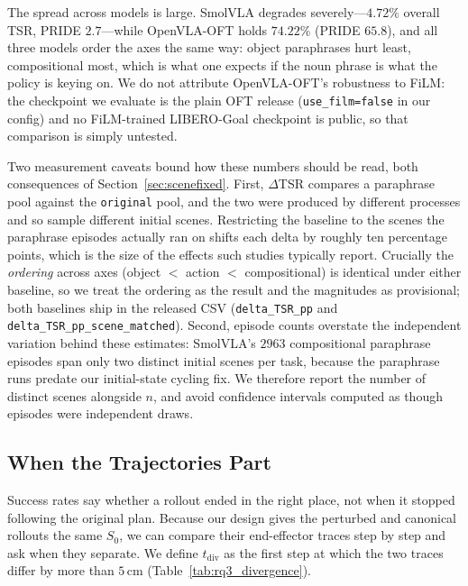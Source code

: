 \documentclass[11pt]{article}
\begin{document}
\begin{table}[h]
\centering
\small

\caption{Paraphrase robustness. \textbf{scenes} is the number of distinct initial
states the $n$ episodes actually cover; where it is far below $n$, the episodes are
repeated draws on the same scene and $n$ overstates the evidence.}
\label{tab:rq2_para}
\end{table}

The spread across models is large. SmolVLA degrades severely---$4.72\%$ overall TSR,
PRIDE $2.7$---while OpenVLA-OFT holds $74.22\%$ (PRIDE $65.8$), and all three models
order the axes the same way: object paraphrases hurt least, compositional most, which
is what one expects if the noun phrase is what the policy is keying on. We do not
attribute OpenVLA-OFT's robustness to FiLM: the checkpoint we evaluate is the plain
OFT release (\texttt{use\_film=false} in our config) and no FiLM-trained LIBERO-Goal
checkpoint is public, so that comparison is simply untested.

Two measurement caveats bound how these numbers should be read, both consequences
of Section~\ref{sec:scenefixed}. First, $\Delta$TSR compares a paraphrase pool
against the \texttt{original} pool, and the two were produced by different processes
and so sample different initial scenes. Restricting the baseline to the scenes the
paraphrase episodes actually ran on shifts each delta by roughly ten percentage
points, which is the size of the effects such studies typically report. Crucially the
\emph{ordering} across axes (object $<$ action $<$ compositional) is identical under
either baseline, so we treat the ordering as the result and the magnitudes as
provisional; both baselines ship in the released CSV
(\texttt{delta\_TSR\_pp} and \texttt{delta\_TSR\_pp\_scene\_matched}). Second, episode counts overstate the
independent variation behind these estimates: SmolVLA's $2963$ compositional
paraphrase episodes span only two distinct initial scenes per task, because the
paraphrase runs predate our initial-state cycling fix. We therefore report the
number of distinct scenes alongside $n$, and avoid confidence intervals computed
as though episodes were independent draws.

\subsection{When the Trajectories Part}
\label{sec:rq3}
Success rates say whether a rollout ended in the right place, not when it stopped
following the original plan. Because our design gives the perturbed and canonical
rollouts the same $S_0$, we can compare their end-effector traces step by step and
ask when they separate. We define $t_{\text{div}}$ as the first step at which the
two traces differ by more than $5$\,cm (Table~\ref{tab:rq3_divergence}).
\end{document}
